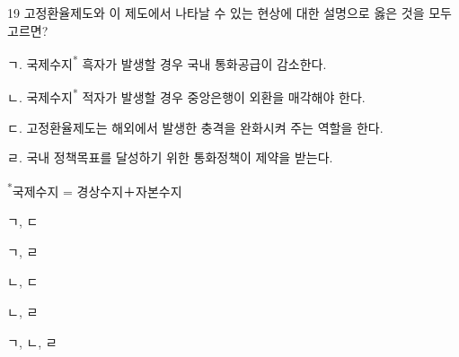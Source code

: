 \begin{question}{19}
고정환율제도와 이 제도에서 나타날 수 있는 현상에 대한 설명으로 옳은 것을 모두 고르면?
\begin{framedtext}
ㄱ. 국제수지\textsuperscript{*} 흑자가 발생할 경우 국내 통화공급이 감소한다. \par
ㄴ. 국제수지\textsuperscript{*} 적자가 발생할 경우 중앙은행이 외환을 매각해야 한다. \par
ㄷ. 고정환율제도는 해외에서 발생한 충격을 완화시켜 주는 역할을 한다. \par
ㄹ. 국내 정책목표를 달성하기 위한 통화정책이 제약을 받는다. \par
\end{framedtext}
\textsuperscript{*}국제수지 = 경상수지＋자본수지

\begin{choices}
  \item ㄱ, ㄷ
  \item ㄱ, ㄹ
  \item ㄴ, ㄷ
  \item ㄴ, ㄹ
  \item ㄱ, ㄴ, ㄹ
\end{choices}
\end{question}
